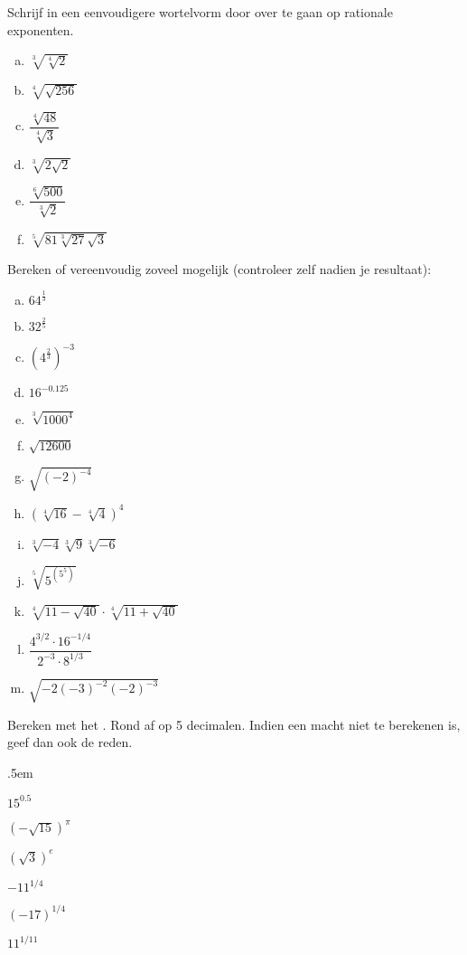 \documentclass[12pt,twoside]{article}
\begin{document}
\begin{oefening}
Schrijf in een eenvoudigere wortelvorm door over te gaan op rationale exponenten.
\begin{multicols}{3}
\begin{enumerate}[(a)]
  \itemsep1em
  \item $\sqrt[3]{\sqrt[4]{2}}$
  \item $\sqrt[4]{\sqrt{256}}$
  \item $\dfrac{\sqrt[4]{48}}{\sqrt[4]{3}}$
  \item $\sqrt[3]{2\sqrt{2}}$
  \item $\dfrac{\sqrt[6]{500}}{\sqrt[3]{2}}$
  \item $\sqrt[5]{81\sqrt[3]{27}\sqrt{3}}$
\end{enumerate}
\end{multicols}
\end{oefening}

\begin{oefening}
Bereken of vereenvoudig zoveel mogelijk (controleer zelf nadien je resultaat):
\begin{multicols}{3}
\begin{enumerate}[(a)]
  \itemsep.5em
  \item $64^{\frac{1}{3}}$
  \item $32^{\frac{2}{5}}$
  \item $\left(4^{\frac{2}{3}}\right)^{-3}$
  \item $16^{-0.125}$
  \item $\sqrt[3]{1000^4}$
  \item $\sqrt{12600}$
  \item $\sqrt{\left(-2\right)^{-4}}$
  \item $\left(\sqrt[4]{16}-\sqrt[4]{4}\right)^4$
  \item $\sqrt[3]{-4}\sqrt[3]{9}\sqrt[3]{-6}$
  \item $\sqrt[5]{5^{(5^5)}}$
  \item $\sqrt[4]{11-\sqrt{40}}\cdot\sqrt[4]{11+\sqrt{40}}$
  \item $\dfrac{4^{3/2}\cdot 16^{-1/4}}{2^{-3}\cdot 8^{1/3}}$
  \item $\sqrt{-2(-3)^{-2}(-2)^{-3}}$
\end{enumerate}
\end{multicols}
\end{oefening}

\begin{oefening}
Bereken met het . Rond af op 5 decimalen. Indien een macht niet te berekenen is, geef dan ook de reden.
\begin{exlist}{3}
  \itemsep.5em
  \item $15^{0.5}$
  \item $\left(-\sqrt{15}\right)^{\pi}$
  \item $\left(\sqrt{3}\right)^e$
  \item $-11^{1/4}$
  \item $(-17)^{1/4}$
  \item $11^{1/11}$
\end{exlist}
\end{oefening}
\end{document}
